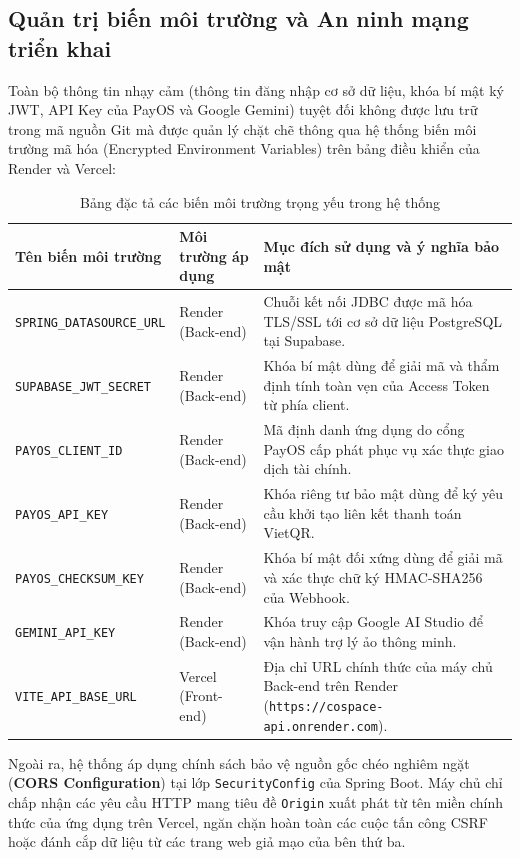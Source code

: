 \subsection{Quản trị biến môi trường và An ninh mạng triển khai}

Toàn bộ thông tin nhạy cảm (thông tin đăng nhập cơ sở dữ liệu, khóa bí mật ký JWT, API Key của PayOS và Google Gemini) tuyệt đối không được lưu trữ trong mã nguồn Git mà được quản lý chặt chẽ thông qua hệ thống biến môi trường mã hóa (Encrypted Environment Variables) trên bảng điều khiển của Render và Vercel:

\begin{table}[H]
\centering
\caption{Bảng đặc tả các biến môi trường trọng yếu trong hệ thống}
\label{tab:env-variables}
\renewcommand{\arraystretch}{1.3}
\begin{tabular}{|p{4.2cm}|p{4.5cm}|p{5.5cm}|}
\hline
\textbf{Tên biến môi trường} & \textbf{Môi trường áp dụng} & \textbf{Mục đích sử dụng và ý nghĩa bảo mật} \\
\hline
\texttt{SPRING\_DATASOURCE\_URL} & Render (Back-end) & Chuỗi kết nối JDBC được mã hóa TLS/SSL tới cơ sở dữ liệu PostgreSQL tại Supabase. \\
\hline
\texttt{SUPABASE\_JWT\_SECRET} & Render (Back-end) & Khóa bí mật dùng để giải mã và thẩm định tính toàn vẹn của Access Token từ phía client. \\
\hline
\texttt{PAYOS\_CLIENT\_ID} & Render (Back-end) & Mã định danh ứng dụng do cổng PayOS cấp phát phục vụ xác thực giao dịch tài chính. \\
\hline
\texttt{PAYOS\_API\_KEY} & Render (Back-end) & Khóa riêng tư bảo mật dùng để ký yêu cầu khởi tạo liên kết thanh toán VietQR. \\
\hline
\texttt{PAYOS\_CHECKSUM\_KEY} & Render (Back-end) & Khóa bí mật đối xứng dùng để giải mã và xác thực chữ ký HMAC-SHA256 của Webhook. \\
\hline
\texttt{GEMINI\_API\_KEY} & Render (Back-end) & Khóa truy cập Google AI Studio để vận hành trợ lý ảo thông minh. \\
\hline
\texttt{VITE\_API\_BASE\_URL} & Vercel (Front-end) & Địa chỉ URL chính thức của máy chủ Back-end trên Render (\texttt{https://cospace-api.onrender.com}). \\
\hline
\end{tabular}
\end{table}

Ngoài ra, hệ thống áp dụng chính sách bảo vệ nguồn gốc chéo nghiêm ngặt (\textbf{CORS Configuration}) tại lớp \texttt{SecurityConfig} của Spring Boot. Máy chủ chỉ chấp nhận các yêu cầu HTTP mang tiêu đề \texttt{Origin} xuất phát từ tên miền chính thức của ứng dụng trên Vercel, ngăn chặn hoàn toàn các cuộc tấn công CSRF hoặc đánh cắp dữ liệu từ các trang web giả mạo của bên thứ ba.

